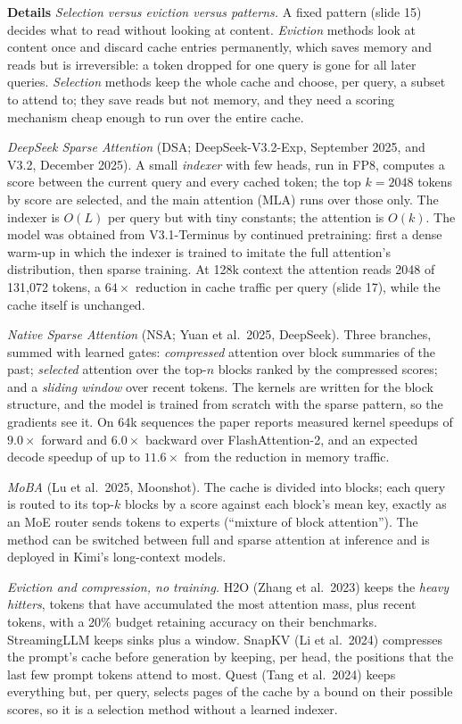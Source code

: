 \documentclass[11pt,letterpaper]{article}
\newcommand{\para}[1]{\medskip\noindent\textbf{#1}\quad}
\begin{document}
\para{Details} \emph{Selection versus eviction versus patterns.} A fixed pattern (slide 15) decides what to read without looking at content. \emph{Eviction} methods look at content once and discard cache entries permanently, which saves memory and reads but is irreversible: a token dropped for one query is gone for all later queries. \emph{Selection} methods keep the whole cache and choose, per query, a subset to attend to; they save reads but not memory, and they need a scoring mechanism cheap enough to run over the entire cache.

\emph{DeepSeek Sparse Attention} (DSA; DeepSeek-V3.2-Exp, September 2025, and V3.2, December 2025). A small \emph{indexer} with few heads, run in FP8, computes a score between the current query and every cached token; the top $k=2048$ tokens by score are selected, and the main attention (MLA) runs over those only. The indexer is $O(L)$ per query but with tiny constants; the attention is $O(k)$. The model was obtained from V3.1-Terminus by continued pretraining: first a dense warm-up in which the indexer is trained to imitate the full attention's distribution, then sparse training. At 128k context the attention reads 2048 of 131,072 tokens, a $64\times$ reduction in cache traffic per query (slide 17), while the cache itself is unchanged.

\emph{Native Sparse Attention} (NSA; Yuan et al.\ 2025, DeepSeek). Three branches, summed with learned gates: \emph{compressed} attention over block summaries of the past; \emph{selected} attention over the top-$n$ blocks ranked by the compressed scores; and a \emph{sliding window} over recent tokens. The kernels are written for the block structure, and the model is trained from scratch with the sparse pattern, so the gradients see it. On 64k sequences the paper reports measured kernel speedups of $9.0\times$ forward and $6.0\times$ backward over FlashAttention-2, and an expected decode speedup of up to $11.6\times$ from the reduction in memory traffic.

\emph{MoBA} (Lu et al.\ 2025, Moonshot). The cache is divided into blocks; each query is routed to its top-$k$ blocks by a score against each block's mean key, exactly as an MoE router sends tokens to experts (``mixture of block attention''). The method can be switched between full and sparse attention at inference and is deployed in Kimi's long-context models.

\emph{Eviction and compression, no training.} H2O (Zhang et al.\ 2023) keeps the \emph{heavy hitters}, tokens that have accumulated the most attention mass, plus recent tokens, with a 20\% budget retaining accuracy on their benchmarks. StreamingLLM keeps sinks plus a window. SnapKV (Li et al.\ 2024) compresses the prompt's cache before generation by keeping, per head, the positions that the last few prompt tokens attend to most. Quest (Tang et al.\ 2024) keeps everything but, per query, selects pages of the cache by a bound on their possible scores, so it is a selection method without a learned indexer.
\end{document}
